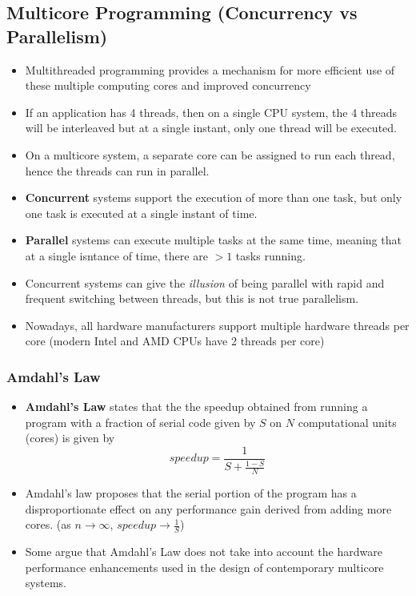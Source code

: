 \documentclass{article}
\theoremstyle{plain}
\theoremstyle{definition}
\begin{document}
\subsection{Multicore Programming (Concurrency vs Parallelism)}
\begin{itemize}
    \item Multithreaded programming provides a mechanism for more efficient use of these multiple computing cores and improved concurrency
    
    \item If an application has 4 threads, then on a single CPU system, the 4 threads will be interleaved but at a single instant, only one thread will be executed. 
    
    \item On a multicore system, a separate core can be assigned to run each thread, hence the threads can run in parallel. 
    
    \item \textbf{Concurrent} systems support the execution of more than one task, but only one task is executed at a single instant of time. 
    
    \item \textbf{Parallel} systems can execute multiple tasks at the same time, meaning that at a single isntance of time, there are $>1$ tasks running. 
    
    \item Concurrent systems can give the \textit{illusion} of being parallel with rapid and frequent switching between threads, but this is not true parallelism.
    
    \item Nowadays, all hardware manufacturers support multiple hardware threads per core (modern Intel and AMD CPUs have 2 threads per core)
\end{itemize}

\subsubsection{Amdahl's Law}
\begin{itemize}
    \item \textbf{Amdahl's Law} states that the the speedup obtained from running a program with a fraction of serial code given by $S$ on $N$ computational units (cores) is given by
    \begin{equation}
        speedup = \frac{1}{S + \frac{1-S}{N}}
    \end{equation}
    
    \item Amdahl's law proposes that the serial portion of the program has a disproportionate effect on any performance gain derived from adding more cores. (as $n \rightarrow \infty$, $speedup \rightarrow \frac{1}{S}$)
    
    \item Some argue that Amdahl’s Law does not take into account the hardware performance enhancements used in the design of contemporary multicore systems.
\end{itemize}
\end{document}
